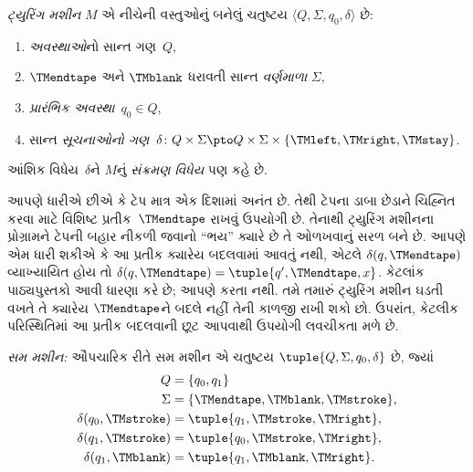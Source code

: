 \begin{defn}[ટ્યુરિંગ મશીન]
\emph{ટ્યુરિંગ મશીન} $M$ એ નીચેની વસ્તુઓનું બનેલું ચતુષ્ટય
$\langle Q, \Sigma, q_0, \delta\rangle$ છે:
\begin{enumerate}
\item \emph{અવસ્થાઓ}નો સાન્ત ગણ~$Q$,
\item $\TMendtape$ અને $\TMblank$ ધરાવતી સાન્ત \emph{વર્ણમાળા}
  $\Sigma$,
\item \emph{પ્રારંભિક અવસ્થા}~$q_0 \in Q$,
\item સાન્ત \emph{સૂચનાઓનો ગણ}~$\delta\colon Q \times \Sigma
  \pto Q \times \Sigma \times \{\TMleft, \TMright, \TMstay\}$.
\end{enumerate}
આંશિક વિધેય~$\delta$ને $M$નું \emph{સંક્રમણ વિધેય}
પણ કહે છે.
\end{defn}

\begin{explain}
આપણે ધારીએ છીએ કે ટેપ માત્ર એક દિશામાં અનંત છે.
તેથી ટેપના ડાબા છેડાને ચિહ્નિત કરવા માટે વિશિષ્ટ
પ્રતીક~$\TMendtape$ રાખવું ઉપયોગી છે. તેનાથી ટ્યુરિંગ
મશીનના પ્રોગ્રામને ટેપની બહાર નીકળી જવાનો ``ભય'' ક્યારે
છે તે ઓળખવાનું સરળ બને છે. આપણે એમ ધારી શકીએ કે આ
પ્રતીક ક્યારેય બદલવામાં આવતું નથી, એટલે
$\delta(q,\TMendtape)$ વ્યાખ્યાયિત હોય તો
$\delta(q,\TMendtape) = \tuple{q', \TMendtape, x}$.
કેટલાંક પાઠ્યપુસ્તકો આવી ધારણા કરે છે; આપણે કરતા નથી.
તમે તમારું ટ્યુરિંગ મશીન ઘડતી વખતે તે ક્યારેય
$\TMendtape$ને બદલે નહીં તેની કાળજી રાખી શકો છો.
ઉપરાંત, કેટલીક પરિસ્થિતિમાં આ પ્રતીક બદલવાની છૂટ
આપવાથી ઉપયોગી લવચીકતા મળે છે.
\end{explain}

\begin{ex}
\emph{સમ મશીન:} ઔપચારિક રીતે સમ મશીન એ ચતુષ્ટય
$\tuple{Q, \Sigma, q_0, \delta}$ છે, જ્યાં
\begin{align*}
Q & = \{ q_0, q_1 \} \\
\Sigma & = \{ \TMendtape, \TMblank, \TMstroke \}, \\
\delta(q_0, \TMstroke) & = \tuple{q_1, \TMstroke, \TMright},\\
\delta(q_1, \TMstroke) & = \tuple{q_0, \TMstroke, \TMright},\\
\delta(q_1, \TMblank)  & = \tuple{q_1, \TMblank, \TMright}.
\end{align*}
\end{ex}
\endgroup


\begingroup
\makeatletter{}\makeatother

\label{guunit:OLP-0257}


